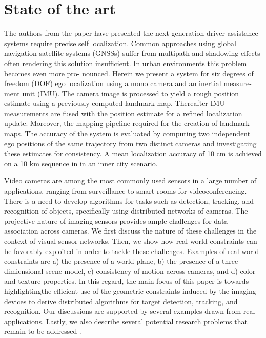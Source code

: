 \chapter{State of the art} \label{capitulo2}

The authors from the paper \cite{Lategahn2013} have presented the next generation driver assistance systems require precise self localization. Common approaches using global navigation satellite systems (GNSSs) suffer from multipath and shadowing effects often rendering this solution insufficient. In urban environments this problem becomes even more pro- nounced. Herein we present a system for six degrees of freedom (DOF) ego localization using a mono camera and an inertial measure- ment unit (IMU). The camera image is processed to yield a rough position estimate using a previously computed landmark map. Thereafter IMU measurements are fused with the position estimate for a refined localization update. Moreover, the mapping pipeline required for the creation of landmark maps. The accuracy of the system is evaluated by computing two independent ego positions of the same trajectory from two distinct cameras and investigating these estimates for consistency. A mean localization accuracy of 10 cm is achieved on a 10 km sequence in in an inner city scenario.

Video cameras are among the most commonly used sensors in a large number of applications, ranging from surveillance to smart rooms for videoconferencing. There is a need to develop algorithms for tasks such as detection, tracking, and recognition of objects, specifically using distributed networks of cameras. The projective nature of imaging sensors provides ample challenges for data association across cameras. We first discuss the nature of these challenges in the context of visual sensor networks. Then, we show how real-world constraints can be favorably exploited in order to tackle these challenges. Examples of real-world constraints are a) the presence of a world plane, b) the presence of a three-dimiensional scene model, c) consistency of motion across cameras, and d) color and texture properties. In this regard, the main focus of this paper is towards highlightingthe efficient use of the geometric constraints induced by the imaging devices to derive distributed algorithms for target detection, tracking, and recognition. Our discussions are supported by several examples drawn from real applications. Lastly, we also describe several potential research problems that remain to be addressed \cite{Sankaranarayanan2008}.

